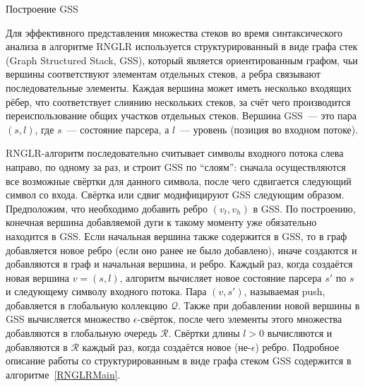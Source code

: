 \begin{algorithm}[!ht]
\begin{algorithmic}[1]
\caption{Построение GSS}
\label{RNGLRMain}
  \EndIf
\EndFunction
{}
    \EndIf
  \EndIf
\EndFunction
\end{algorithmic}
\end{algorithm}

Для эффективного представления множества стеков во время синтаксического анализа в алгоритме RNGLR используется структурированный в виде графа стек (Graph Structured Stack, GSS), который является ориентированным графом, чьи вершины соответствуют  элементам отдельных стеков, а ребра связывают последовательные элементы. Каждая вершина может иметь несколько входящих рёбер, что соответствует слиянию нескольких стеков, за счёт чего производится переиспользование общих участков отдельных стеков. Вершина GSS~--- это пара $(s,l)$, где $s$~--- состояние парсера, а $l$~--- уровень (позиция во входном потоке).

RNGLR-алгоритм последовательно считывает символы входного потока слева направо, по одному за раз, и строит GSS по ``слоям'': сначала осуществляются все возможные свёртки для данного символа, после чего сдвигается следующий символ со входа. Свёртка или сдвиг модифицируют GSS следующим образом. Предположим, что необходимо добавить ребро $(v_t,v_h)$ в GSS. По построению, конечная вершина добавляемой дуги к такому моменту уже обязательно находится в GSS. Если начальная вершина также содержится в GSS, то в граф добавляется новое ребро (если оно ранее не было добавлено), иначе создаются и добавляются в граф и начальная вершина, и ребро. Каждый раз, когда создаётся новая вершина $v=(s,l)$, алгоритм вычисляет новое состояние парсера $s'$ по $s$ и следующему символу входного потока. Пара $(v,s')$, называемая push, добавляется в глобальную коллекцию $\mathcal{Q}$. Также при добавлении новой вершины в GSS вычисляется множество $\epsilon$-свёрток, после чего элементы этого множества добавляются в глобальную очередь $\mathcal{R}$. Свёртки длины $l>0$ вычисляются и добавляются в $\mathcal{R}$ каждый раз, когда создаётся новое (не-$\epsilon$) ребро. Подробное описание работы со структурированным в виде графа стеком GSS содержится в алгоритме~\ref{RNGLRMain}.

